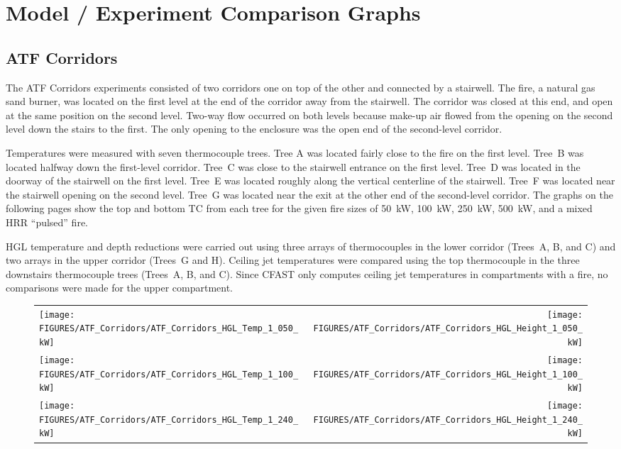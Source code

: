 \chapter{Model / Experiment Comparison Graphs}
\label{sec:Graphs}

\section{ATF Corridors}

The ATF Corridors experiments consisted of two corridors one on top of the other and connected by a stairwell. The fire, a natural gas sand burner, was located on the first level at the end of the corridor away from the stairwell. The corridor was closed at this end, and open at the same position on the second level. Two-way flow occurred on both levels because make-up air flowed from the opening on the second level down the stairs to the first. The only opening to the enclosure was the open end of the second-level corridor.

Temperatures were measured with seven thermocouple trees. Tree A was located fairly close to the fire on the first level. Tree~B was located halfway down the first-level corridor. Tree~C was close to the stairwell entrance on the first level. Tree~D was located in the doorway of the stairwell on the first level. Tree~E was located roughly along the vertical centerline of the
stairwell. Tree~F was located near the stairwell opening on the second level. Tree~G was located near the exit at the other end of the second-level corridor. The graphs on the following pages show the top and bottom TC from each tree for the given fire sizes of 50~kW, 100~kW, 250~kW, 500~kW, and a mixed HRR ``pulsed'' fire.

HGL temperature and depth reductions were carried out using three arrays of thermocouples in the lower corridor (Trees~A, B, and C) and two arrays in the upper corridor (Trees~G and H).
Ceiling jet temperatures were compared using the top thermocouple in the three downstairs thermocouple trees (Trees~A, B, and C). Since CFAST only computes ceiling jet temperatures in compartments with a fire, no comparisons were made for the upper compartment.

\begin{figure}
\begin{tabular*}{\textwidth}{l@{\extracolsep{\fill}}r}
\texttt{[image: FIGURES/ATF\_Corridors/ATF\_Corridors\_HGL\_Temp\_1\_050\_kW]} &
\texttt{[image: FIGURES/ATF\_Corridors/ATF\_Corridors\_HGL\_Height\_1\_050\_kW]} \\
\texttt{[image: FIGURES/ATF\_Corridors/ATF\_Corridors\_HGL\_Temp\_1\_100\_kW]} &
\texttt{[image: FIGURES/ATF\_Corridors/ATF\_Corridors\_HGL\_Height\_1\_100\_kW]} \\
\texttt{[image: FIGURES/ATF\_Corridors/ATF\_Corridors\_HGL\_Temp\_1\_240\_kW]} &
\texttt{[image: FIGURES/ATF\_Corridors/ATF\_Corridors\_HGL\_Height\_1\_240\_kW]}
\end{tabular*}
\end{figure}

